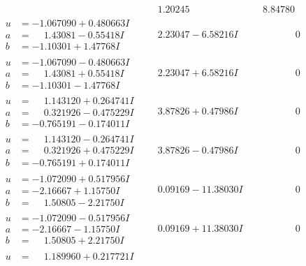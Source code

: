 \documentclass[1p]{elsarticle_modified}
\theoremstyle{definition}
\begin{document}
$$\begin{array}{c|c|c}
 & \phantom{-}1.20245\phantom{ +0.000000I} & \phantom{-}8.84780\phantom{ +0.000000I} \\ \hline\begin{aligned}
u &= -1.067090 + 0.480663 I \\
a &= \phantom{-}1.43081 - 0.55418 I \\
b &= -1.10301 + 1.47768 I\end{aligned}
 & \phantom{-}2.23047 - 6.58216 I & \phantom{-0.000000 } 0 \\ \hline\begin{aligned}
u &= -1.067090 - 0.480663 I \\
a &= \phantom{-}1.43081 + 0.55418 I \\
b &= -1.10301 - 1.47768 I\end{aligned}
 & \phantom{-}2.23047 + 6.58216 I & \phantom{-0.000000 } 0 \\ \hline\begin{aligned}
u &= \phantom{-}1.143120 + 0.264741 I \\
a &= \phantom{-}0.321926 - 0.475229 I \\
b &= -0.765191 - 0.174011 I\end{aligned}
 & \phantom{-}3.87826 + 0.47986 I & \phantom{-0.000000 } 0 \\ \hline\begin{aligned}
u &= \phantom{-}1.143120 - 0.264741 I \\
a &= \phantom{-}0.321926 + 0.475229 I \\
b &= -0.765191 + 0.174011 I\end{aligned}
 & \phantom{-}3.87826 - 0.47986 I & \phantom{-0.000000 } 0 \\ \hline\begin{aligned}
u &= -1.072090 + 0.517956 I \\
a &= -2.16667 + 1.15750 I \\
b &= \phantom{-}1.50805 - 2.21750 I\end{aligned}
 & \phantom{-}0.09169 - 11.38030 I & \phantom{-0.000000 } 0 \\ \hline\begin{aligned}
u &= -1.072090 - 0.517956 I \\
a &= -2.16667 - 1.15750 I \\
b &= \phantom{-}1.50805 + 2.21750 I\end{aligned}
 & \phantom{-}0.09169 + 11.38030 I & \phantom{-0.000000 } 0 \\ \hline\begin{aligned}
u &= \phantom{-}1.189960 + 0.217721 I \\

\end{aligned}
\end{array}$$
\end{document}
